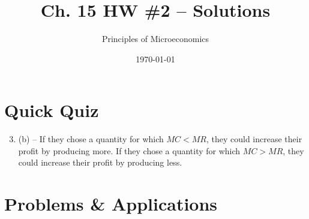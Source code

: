 \documentclass{article}
\title{Ch. 15 HW \#2 -- Solutions}
\author{Principles of Microeconomics}
\date{\today}
\begin{document}
\maketitle

\section*{Quick Quiz}

\begin{enumerate}

\setcounter{enumi}{2}
\item (b) -- If they chose a quantity for which $MC < MR$, they could increase their profit by producing more. If they chose a quantity for which $MC > MR$, they could increase their profit by producing less.



\end{enumerate}

\section*{Problems \& Applications}
\end{document}
